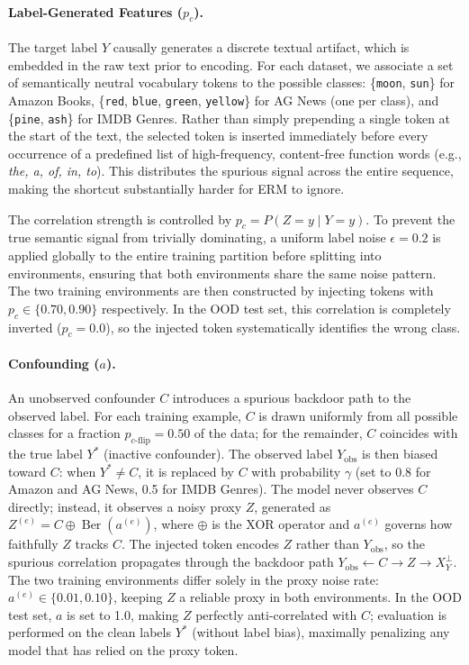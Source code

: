 \documentclass[11pt]{article}
\theoremstyle{definition}
\theoremstyle{plain}
\begin{document}
\paragraph{Label-Generated Features ($p_c$).} The target label $Y$ causally generates a discrete textual artifact, which is embedded in the raw text prior to encoding. For each dataset, we associate a set of semantically neutral vocabulary tokens to the possible classes: \{\texttt{moon}, \texttt{sun}\} for Amazon Books, \{\texttt{red}, \texttt{blue}, \texttt{green}, \texttt{yellow}\} for AG News (one per class), and \{\texttt{pine}, \texttt{ash}\} for IMDB Genres. Rather than simply prepending a single token at the start of the text, the selected token is inserted immediately before every occurrence of a predefined list of high-frequency, content-free function words (e.g., \emph{the, a, of, in, to}). This distributes the spurious signal across the entire sequence, making the shortcut substantially harder for ERM to ignore.

The correlation strength is controlled by $p_c = P(Z=y \mid Y=y)$. To prevent the true semantic signal from trivially dominating, a uniform label noise $\epsilon = 0.2$ is applied globally to the entire training partition before splitting into environments, ensuring that both environments share the same noise pattern. The two training environments are then constructed by injecting tokens with $p_c \in \{0.70, 0.90\}$ respectively. In the OOD test set, this correlation is completely inverted ($p_c = 0.0$), so the injected token systematically identifies the wrong class.

\paragraph{Confounding ($a$).} An unobserved confounder $C$ introduces a spurious backdoor path to the observed label. For each training example, $C$ is drawn uniformly from all possible classes for a fraction $p_{c\text{-flip}} = 0.50$ of the data; for the remainder, $C$ coincides with the true label $Y^*$ (inactive confounder). The observed label $Y_{\text{obs}}$ is then biased toward $C$: when $Y^* \neq C$, it is replaced by $C$ with probability $\gamma$ (set to 0.8 for Amazon and AG News, 0.5 for IMDB Genres). The model never observes $C$ directly; instead, it observes a noisy proxy $Z$, generated as $Z^{(e)} = C \oplus \operatorname{Ber}(a^{(e)})$, where $\oplus$ is the XOR operator and $a^{(e)}$ governs how faithfully $Z$ tracks $C$. The injected token encodes $Z$ rather than $Y_{\text{obs}}$, so the spurious correlation propagates through the backdoor path $Y_{\text{obs}} \leftarrow C \rightarrow Z \rightarrow X_Y^{\perp}$. The two training environments differ solely in the proxy noise rate: $a^{(e)} \in \{0.01, 0.10\}$, keeping $Z$ a reliable proxy in both environments. In the OOD test set, $a$ is set to 1.0, making $Z$ perfectly anti-correlated with $C$; evaluation is performed on the clean labels $Y^*$ (without label bias), maximally penalizing any model that has relied on the proxy token.
\end{document}
